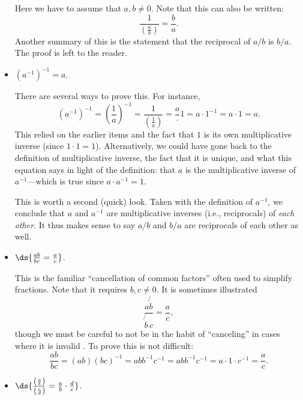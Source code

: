 \begin{itemize}
Here we have to assume that $a,b\ne0$.\footnotemark
{}%
\hphantom{. }Note that this can also be written:
$$\frac1{\left(\frac{a}b\right)}=\frac{b}a.$$
Another summary of this is the statement that
the reciprocal of $a/b$ is $b/a$. The proof is left to the reader.

\item $(a^{-1})^{-1}=a$.

There are several ways to prove this.  For instance,
$$(a^{-1})^{-1}=\left(\frac1a\right)^{-1}=
\frac1{\left(\frac1a\right)}=\frac{a}\cdot1=a\cdot1^{-1}=a\cdot1=a.$$
This relied on the earlier items and the fact that
$1$ is its own multiplicative inverse (since $1\cdot1=1$).
Alternatively, we could have gone back to the definition
of multiplicative inverse, the fact that it is unique,
and what this equation says in light of the definition:
that $a$ is the multiplicative inverse of 
$a^{-1}$---which is true since $a\cdot a^{-1}=1$.

This is worth a second (quick) look. Taken with the definition
of $a^{-1}$, we conclude that $a$ and $a^{-1}$ are multiplicative
inverses (i.e., reciprocals) of {\it each other}.  It thus 
makes sense to say $a/b$ and $b/a$ are reciprocals
of each other as well.

\item $\ds{\frac{ab}{bc}=\frac{a}c}$.

This is the familiar ``cancellation of common factors''
often used to simplify fractions.  Note that it requires
$b,c\ne0$. It is sometimes illustrated
$$\frac{a\!\not{\!b}}{\not{\!b}\,c}=\frac{a}c,$$
though we must be careful to not be in the habit
of ``canceling'' in cases where it is invalid%
\footnotemark. 
 To prove
this is not difficult:
$$\frac{ab}{bc}=(ab)(bc)^{-1}
=abb^{-1}c^{-1}=abb^{-1}c^{-1}=a\cdot 1\cdot c^{-1}=\frac{a}c.$$

\item $\ds{\frac{\left(\frac{a}b\right)}{\left(\frac{c}d\right)}
=\frac{a}b\cdot\frac{d}c}$.
\end{itemize}

